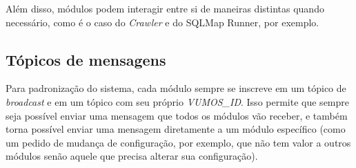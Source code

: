     Além disso, módulos podem interagir entre si de maneiras distintas quando necessário, como é o caso do \textit{Crawler} e do SQLMap Runner, por exemplo.
    
    \subsection{Tópicos de mensagens}
    
    Para padronização do sistema, cada módulo sempre se inscreve em um tópico de \textit{broadcast} e em um tópico com seu próprio \textit{VUMOS\_ID}. Isso permite que sempre seja possível enviar uma mensagem que todos os módulos vão receber, e também torna possível enviar uma mensagem diretamente a um módulo específico (como um pedido de mudança de configuração, por exemplo, que não tem valor a outros módulos senão aquele que precisa alterar sua configuração).
    

    







% 